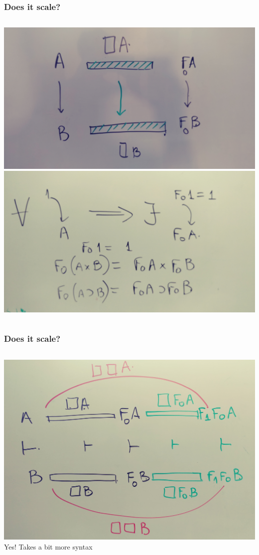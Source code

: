 \documentclass{beamer}
\begin{document}
   \begin{frame}
    \frametitle{Does it scale?}
    \begin{columns}
    \includegraphics[scale=0.05, trim={10cm 0 10cm 0}, clip]{pics/20171111_163222_Film1}
    \includegraphics[scale=0.035, trim={5cm 0 10cm 0}, clip]{pics/20171111_141821_Film1}
    
  \end{columns}
    \end{frame}
    \begin{frame}
      \frametitle{Does it scale?}
      \begin{columns}
      \includegraphics[scale=0.05]{pics/20171111_141413_Film1}
          Yes! Takes  a bit more syntax
    \end{columns}
      \end{frame}
    
\end{document}
